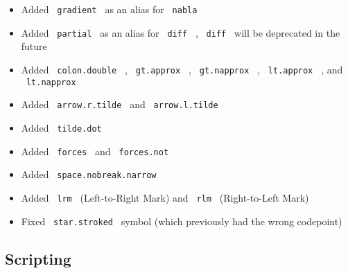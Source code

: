 \begin{itemize}
\tightlist
\item
  Added \texttt{\ gradient\ } as an alias for \texttt{\ nabla\ }
\item
  Added \texttt{\ partial\ } as an alias for \texttt{\ diff\ } ,
  \texttt{\ diff\ } will be deprecated in the future
\item
  Added \texttt{\ colon.double\ } , \texttt{\ gt.approx\ } ,
  \texttt{\ gt.napprox\ } , \texttt{\ lt.approx\ } , and
  \texttt{\ lt.napprox\ }
\item
  Added \texttt{\ arrow.r.tilde\ } and \texttt{\ arrow.l.tilde\ }
\item
  Added \texttt{\ tilde.dot\ }
\item
  Added \texttt{\ forces\ } and \texttt{\ forces.not\ }
\item
  Added \texttt{\ space.nobreak.narrow\ }
\item
  Added \texttt{\ lrm\ } (Left-to-Right Mark) and \texttt{\ rlm\ }
  (Right-to-Left Mark)
\item
  Fixed \texttt{\ star.stroked\ } symbol (which previously had the wrong
  codepoint)
\end{itemize}

\subsection{Scripting}\label{scripting}

